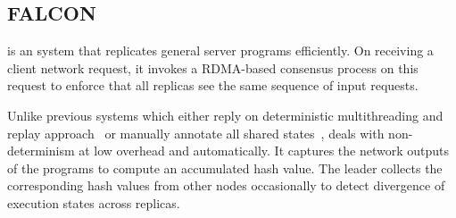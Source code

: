 \subsection{FALCON} \label{sec:falcon}

\smrsystem is an \smr system that replicates general server programs efficiently. On 
receiving a client network request, it invokes a RDMA-based consensus process on this 
request to enforce that all replicas see the same sequence of input requests. 

Unlike previous \smr systems which either reply on deterministic multithreading and replay
approach~\cite{rex:eurosys14} or manually annotate all shared states~\cite{eve:osdi12}, 
\smrsystem deals with non-determinism at low overhead and automatically. It captures the 
network outputs of the programs to compute an accumulated hash value. The leader collects 
the corresponding hash values from other nodes occasionally to detect divergence of execution 
states across replicas.
